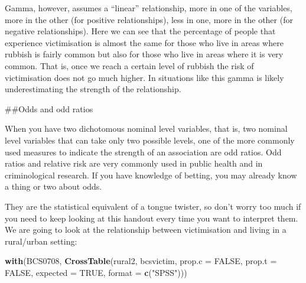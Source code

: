\documentclass[]{book}
\newenvironment{Shaded}{\begin{snugshade}}{\end{snugshade}}
\newcommand{\DataTypeTok}[1]{\textcolor[rgb]{0.13,0.29,0.53}{#1}}
\newcommand{\KeywordTok}[1]{\textcolor[rgb]{0.13,0.29,0.53}{\textbf{#1}}}
\newcommand{\NormalTok}[1]{#1}
\newcommand{\OtherTok}[1]{\textcolor[rgb]{0.56,0.35,0.01}{#1}}
\newcommand{\StringTok}[1]{\textcolor[rgb]{0.31,0.60,0.02}{#1}}
\theoremstyle{definition}
\theoremstyle{definition}
\theoremstyle{definition}
\theoremstyle{remark}
\begin{document}
Gamma, however, assumes a ``linear'' relationship, more in one of the
variables, more in the other (for positive relationships), less in one,
more in the other (for negative relationships). Here we can see that the
percentage of people that experience victimisation is almost the same
for those who live in areas where rubbish is fairly common but also for
those who live in areas where it is very common. That is, once we reach
a certain level of rubbish the risk of victimisation does not go much
higher. In situations like this gamma is likely underestimating the
strength of the relationship.

\#\#Odds and odd ratios

When you have two dichotomous nominal level variables, that is, two
nominal level variables that can take only two possible levels, one of
the more commonly used measures to indicate the strength of an
association are odd ratios. Odd ratios and relative risk are very
commonly used in public health and in criminological research. If you
have knowledge of betting, you may already know a thing or two about
odds.

They are the statistical equivalent of a tongue twister, so don't worry
too much if you need to keep looking at this handout every time you want
to interpret them. We are going to look at the relationship between
victimisation and living in a rural/urban setting:

\begin{Shaded}
\begin{Highlighting}[]
\KeywordTok{with}\NormalTok{(BCS0708, }\KeywordTok{CrossTable}\NormalTok{(rural2, bcsvictim, }\DataTypeTok{prop.c =} \OtherTok{FALSE}\NormalTok{, }\DataTypeTok{prop.t =} \OtherTok{FALSE}\NormalTok{, }\DataTypeTok{expected =} \OtherTok{TRUE}\NormalTok{, }\DataTypeTok{format =} \KeywordTok{c}\NormalTok{(}\StringTok{"SPSS"}\NormalTok{)))}
\end{Highlighting}
\end{Shaded}
\end{document}
